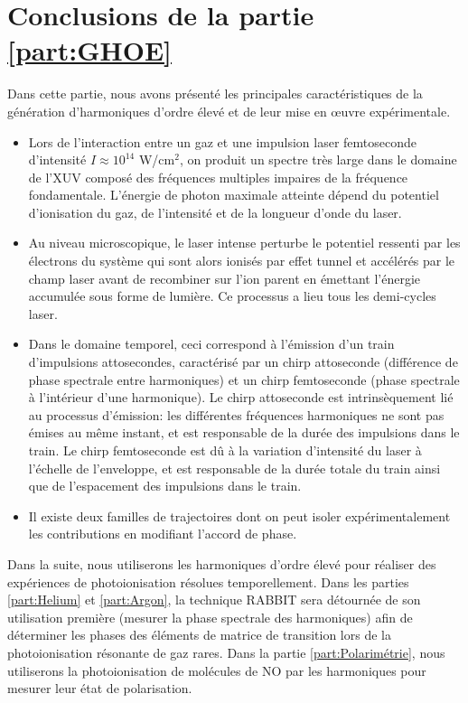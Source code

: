 \section*{Conclusions de la partie \ref{part:GHOE}}
Dans cette partie, nous avons présenté les principales caractéristiques de la génération d'harmoniques d'ordre élevé et de leur mise en \oe uvre expérimentale. 
\begin{itemize}
\item Lors de l'interaction entre un gaz et une impulsion laser femtoseconde d'intensité $I \approx 10^{14}$ W/cm$^2$, on produit un spectre très large dans le domaine de l'XUV composé des fréquences multiples impaires de la fréquence fondamentale. L'énergie de photon maximale atteinte dépend du potentiel d'ionisation du gaz, de l'intensité et de la longueur d'onde du laser.
\item Au niveau microscopique, le laser intense perturbe le potentiel ressenti par les électrons du système qui sont alors ionisés par effet tunnel et accélérés par le champ laser avant de recombiner sur l'ion parent en émettant l'énergie accumulée sous forme de lumière. Ce processus a lieu tous les demi-cycles laser.
\item Dans le domaine temporel, ceci correspond à l'émission d'un train d'impulsions attosecondes, caractérisé par un chirp attoseconde (différence de phase spectrale entre harmoniques) et un chirp femtoseconde (phase spectrale à l'intérieur d'une harmonique). Le chirp attoseconde est intrinsèquement lié au processus d'émission: les différentes fréquences harmoniques ne sont pas émises au même instant, et est responsable de la durée des impulsions dans le train. Le chirp femtoseconde est dû à la variation d'intensité du laser à l'échelle de l'enveloppe, et est responsable de la durée totale du train ainsi que de l'espacement des impulsions dans le train.
\item Il existe deux familles de trajectoires dont on peut isoler expérimentalement les contributions en modifiant l'accord de phase.
\end{itemize}

Dans la suite, nous utiliserons les harmoniques d'ordre élevé pour réaliser des expériences de photoionisation résolues temporellement. Dans les parties \ref{part:Helium} et \ref{part:Argon}, la technique RABBIT sera détournée de son utilisation première (mesurer la phase spectrale des harmoniques) afin de déterminer les phases des éléments de matrice de transition lors de la photoionisation résonante de gaz rares. Dans la partie \ref{part:Polarimétrie}, nous utiliserons la photoionisation de molécules de NO par les harmoniques pour mesurer leur état de polarisation.